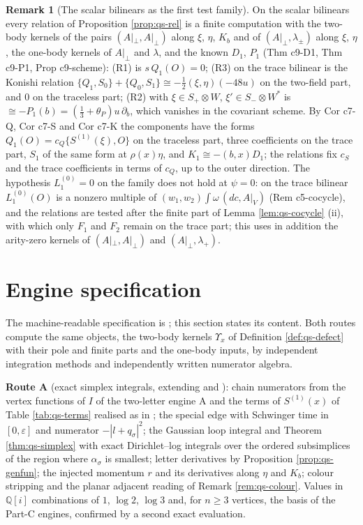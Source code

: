 \documentclass[11pt]{article}
\numberwithin{equation}{section}
\theoremstyle{plain}
\theoremstyle{definition}
\newtheorem{remark}[theorem]{Remark}
\newcommand{\Ap}{A|_{\perp}}
\newcommand{\AV}{A|_V}
\begin{document}
\begin{remark}[The scalar bilinears as the first test family]
\label{rem:qs-bilinears}
On the scalar bilinears every relation of Proposition \ref{prop:qs-rel} is a finite computation with the two-body kernels of the pairs $(\Ap,\Ap)$ along $\xi$, $\eta$, $K_b$ and of $(\Ap,\lambda_\pm)$ along $\xi$, $\eta$, the one-body kernels of $\Ap$ and $\lambda$, and the known $D_1$, $P_1$ (Thm c9-D1, Thm c9-P1, Prop c9-scheme): (R1) is $s\,Q_1(O)=0$; (R3) on the trace bilinear is the Konishi relation $\{Q_1,S_0\}+\{Q_0,S_1\}\cong-\tfrac12(\xi,\eta)(-48u)$ on the two-field part, and $0$ on the traceless part; (R2) with $\xi\in S_+\otimes W$, $\xi'\in S_-\otimes W^*$ is $\cong-P_1(b)=(\tfrac13+\theta_P)u\,\partial_b$, which vanishes in the covariant scheme. By Cor c7-Q, Cor c7-S and Cor c7-K the components have the forms $Q_1(O)=c_Q\{S^{(1)}(\xi),O\}$ on the traceless part, three coefficients on the trace part, $S_1$ of the same form at $\rho(x)\eta$, and $K_1\cong-(b,x)D_1$; the relations fix $c_S$ and the trace coefficients in terms of $c_Q$, up to the outer direction. The hypothesis $L_1^{(0)}=0$ on the family does not hold at $\psi=0$: on the trace bilinear $L_1^{(0)}(O)$ is a nonzero multiple of $(w_1,w_2)\int\omega\,(dc,\AV)$ (Rem c5-cocycle), and the relations are tested after the finite part of Lemma \ref{lem:qs-cocycle} (ii), with which only $F_1$ and $F_2$ remain on the trace part; this uses in addition the arity-zero kernels of $(\Ap,\Ap)$ and $(\Ap,\lambda_+)$.
\end{remark}

\section{Engine specification}
\label{sec:qs-engines}

The machine-readable specification is ; this section states its content. Both routes compute the same objects, the two-body kernels $\Upsilon_x$ of Definition \ref{def:qs-defect} with their pole and finite parts and the one-body inputs, by independent integration methods and independently written numerator algebra.

\textbf{Route A} (exact simplex integrals, extending  and ): chain numerators from the vertex functions of $I$ of the two-letter engine A and the terms of $S^{(1)}(x)$ of Table \ref{tab:qs-terms} realised as in ; the special edge with Schwinger time in $[0,\varepsilon]$ and numerator $-|l+q_\sigma|^2$; the Gaussian loop integral and Theorem \ref{thm:qs-simplex} with exact Dirichlet--log integrals over the ordered subsimplices of the region where $\alpha_\sigma$ is smallest; letter derivatives by Proposition \ref{prop:qs-genfun}; the injected momentum $r$ and its derivatives along $\eta$ and $K_b$; colour stripping and the planar adjacent reading of Remark \ref{rem:qs-colour}. Values in $\mathbb Q[i]$ combinations of $1$, $\log2$, $\log3$ and, for $n\ge3$ vertices, the basis of the Part-C engines, confirmed by a second exact evaluation.
\end{document}

